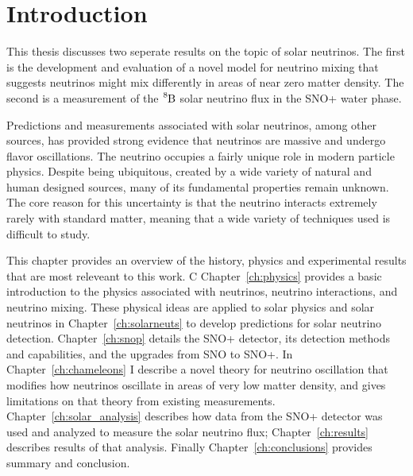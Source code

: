 
\chapter{Introduction}

\ifpdf
    \graphicspath{{introduction/figures/PNG/}{introduction/figures/PDF/}{introduction/figures/}}
\else
    \graphicspath{{introduction/figures/EPS/}{introduction/figures/}}
\fi

This thesis discusses two seperate results on the topic of solar neutrinos.
The first is the development and evaluation of a novel model for neutrino
mixing that suggests neutrinos might mix differently in areas of near zero
matter density.
The second is a measurement of the $\ce{^{8}B}$ solar neutrino flux
in the SNO+ water phase.

Predictions and measurements associated with solar neutrinos, among other
sources, has provided strong evidence that neutrinos are massive and undergo
flavor oscillations.
The neutrino occupies a fairly unique role in modern particle physics.
Despite being ubiquitous, created by a wide variety of natural and human
designed sources,
many of its fundamental properties remain unknown.
The core reason for this uncertainty is that the neutrino interacts extremely rarely
with standard matter, meaning that a wide variety of techniques used
is difficult to study.

This chapter provides an overview of the history, physics and experimental
results that are most releveant to this work.
C
Chapter~\ref{ch:physics} provides a basic introduction to the physics associated
with neutrinos, neutrino interactions, and neutrino mixing.
These physical ideas are applied to solar physics and solar neutrinos in Chapter~\ref{ch:solarneuts}
to develop predictions for solar neutrino detection.
Chapter~\ref{ch:snop} details the SNO+ detector, its detection methods and
capabilities, and the upgrades from SNO to SNO+.
In Chapter~\ref{ch:chameleons} I describe a novel theory for neutrino oscillation
that modifies how neutrinos oscillate in areas of very low matter density,
and gives limitations on that theory from existing measurements.
Chapter~\ref{ch:solar_analysis} describes how data from the SNO+ detector
was used and analyzed to measure the solar neutrino flux;
Chapter~\ref{ch:results} describes results of that analysis.
Finally Chapter~\ref{ch:conclusions} provides summary and conclusion.
